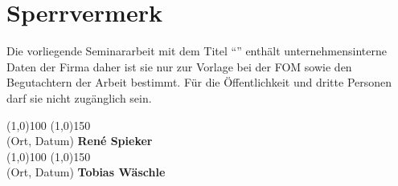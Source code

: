 \section*{Sperrvermerk}
Die vorliegende Seminararbeit mit dem Titel ``\MyTitel{}'' enthält unternehmensinterne Daten der Firma \MyFirma{} daher ist sie nur zur Vorlage bei der FOM sowie den Begutachtern der Arbeit bestimmt. Für die Öffentlichkeit und dritte Personen darf sie nicht zugänglich sein.
\\[3cm]
\begin{flushright}
\line(1,0){100} \hfill \line(1,0){150}\\
(Ort, Datum) \hfill \textbf{René Spieker}\\[1.5cm]
\line(1,0){100} \hfill \line(1,0){150}\\
(Ort, Datum) \hfill \textbf{Tobias Wäschle}\\
\end{flushright}